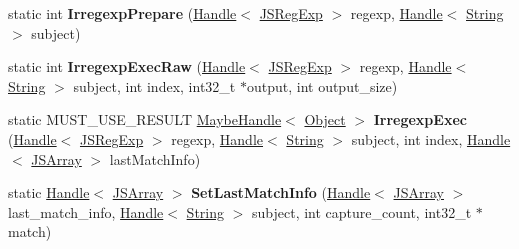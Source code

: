 \begin{DoxyCompactItemize}
\item 
static int {\bfseries Irregexp\+Prepare} (\hyperlink{classv8_1_1internal_1_1_handle}{Handle}$<$ \hyperlink{classv8_1_1internal_1_1_j_s_reg_exp}{J\+S\+Reg\+Exp} $>$ regexp, \hyperlink{classv8_1_1internal_1_1_handle}{Handle}$<$ \hyperlink{classv8_1_1internal_1_1_string}{String} $>$ subject)\hypertarget{classv8_1_1internal_1_1_reg_exp_impl_aaae88e8097d51ac38eafb7775de3eb8b}{}\label{classv8_1_1internal_1_1_reg_exp_impl_aaae88e8097d51ac38eafb7775de3eb8b}

\item 
static int {\bfseries Irregexp\+Exec\+Raw} (\hyperlink{classv8_1_1internal_1_1_handle}{Handle}$<$ \hyperlink{classv8_1_1internal_1_1_j_s_reg_exp}{J\+S\+Reg\+Exp} $>$ regexp, \hyperlink{classv8_1_1internal_1_1_handle}{Handle}$<$ \hyperlink{classv8_1_1internal_1_1_string}{String} $>$ subject, int index, int32\+\_\+t $\ast$output, int output\+\_\+size)\hypertarget{classv8_1_1internal_1_1_reg_exp_impl_ac4818db8f6c4a1dad7838d55a54784c0}{}\label{classv8_1_1internal_1_1_reg_exp_impl_ac4818db8f6c4a1dad7838d55a54784c0}

\item 
static M\+U\+S\+T\+\_\+\+U\+S\+E\+\_\+\+R\+E\+S\+U\+LT \hyperlink{classv8_1_1internal_1_1_maybe_handle}{Maybe\+Handle}$<$ \hyperlink{classv8_1_1internal_1_1_object}{Object} $>$ {\bfseries Irregexp\+Exec} (\hyperlink{classv8_1_1internal_1_1_handle}{Handle}$<$ \hyperlink{classv8_1_1internal_1_1_j_s_reg_exp}{J\+S\+Reg\+Exp} $>$ regexp, \hyperlink{classv8_1_1internal_1_1_handle}{Handle}$<$ \hyperlink{classv8_1_1internal_1_1_string}{String} $>$ subject, int index, \hyperlink{classv8_1_1internal_1_1_handle}{Handle}$<$ \hyperlink{classv8_1_1internal_1_1_j_s_array}{J\+S\+Array} $>$ last\+Match\+Info)\hypertarget{classv8_1_1internal_1_1_reg_exp_impl_a064905c94750360de1eaef77f2fcd813}{}\label{classv8_1_1internal_1_1_reg_exp_impl_a064905c94750360de1eaef77f2fcd813}

\item 
static \hyperlink{classv8_1_1internal_1_1_handle}{Handle}$<$ \hyperlink{classv8_1_1internal_1_1_j_s_array}{J\+S\+Array} $>$ {\bfseries Set\+Last\+Match\+Info} (\hyperlink{classv8_1_1internal_1_1_handle}{Handle}$<$ \hyperlink{classv8_1_1internal_1_1_j_s_array}{J\+S\+Array} $>$ last\+\_\+match\+\_\+info, \hyperlink{classv8_1_1internal_1_1_handle}{Handle}$<$ \hyperlink{classv8_1_1internal_1_1_string}{String} $>$ subject, int capture\+\_\+count, int32\+\_\+t $\ast$match)\hypertarget{classv8_1_1internal_1_1_reg_exp_impl_a67164089ba7ffc8453d6904d3f5c137b}{}\label{classv8_1_1internal_1_1_reg_exp_impl_a67164089ba7ffc8453d6904d3f5c137b}


\end{DoxyCompactItemize}
